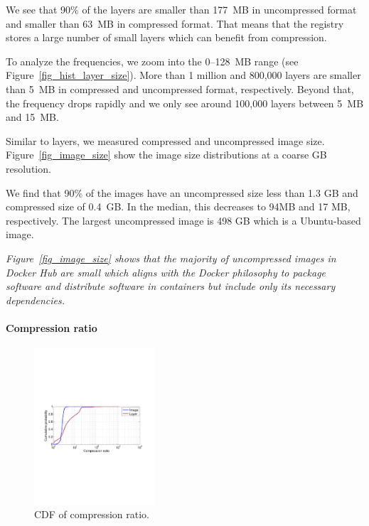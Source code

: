 We see that 90\% of the layers are smaller than 177~MB in uncompressed format
and smaller than 63~MB in compressed format.
That means that the registry stores a large number of small layers
which can benefit from compression.

To analyze the frequencies, we zoom into the 0--128~MB range (see
Figure~\ref{fig_hist_layer_size}).
More than 1 million and 800,000 layers are smaller than 5~MB in compressed and
uncompressed format, respectively. Beyond that, the frequency drops rapidly and
we only see around 100,000 layers between 5~MB and 15~MB.

Similar to layers, we measured compressed and uncompressed image size. Figure~\ref{fig_image_size} show the image size distributions at a coarse GB
resolution. 

We find that 90\% of the images have an uncompressed size less than
1.3 GB and compressed size of 0.4~GB.
In the median, this decreases to 94MB and 17 MB, respectively.  The largest
uncompressed image is 498 GB which is a Ubuntu-based image.  

\emph{Figure~\ref{fig_image_size} shows that the majority of uncompressed images in
Docker Hub are small which aligns with the Docker philosophy to package
software and distribute software in containers but include only its necessary
dependencies.}

\paragraph{Compression ratio}
\begin{figure}
	\centering
	\includegraphics[width=0.4\textwidth]{graphs/compress-ratio-cdf.pdf}
	\caption{CDF of compression ratio.
	}
	\label{fig:compress-ratio}
\end{figure}

